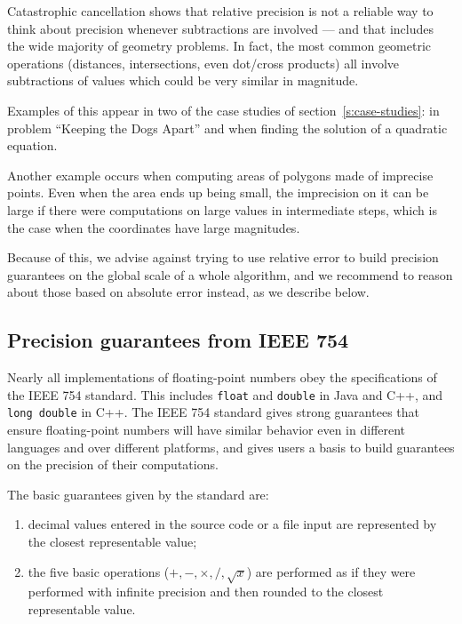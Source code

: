 Catastrophic cancellation shows that relative precision is not a reliable way to think about precision whenever subtractions are involved --- and that includes the wide majority of geometry problems.
In fact, the most common geometric operations (distances, intersections, even dot/cross products) all involve subtractions of values which could be very similar in magnitude.

Examples of this appear in two of the case studies of section~\ref{s:case-studies}: in problem ``Keeping the Dogs Apart'' and when finding the solution of a quadratic equation.

Another example occurs when computing areas of polygons made of imprecise points. Even when the area ends up being small, the imprecision on it can be large if there were computations on large values in intermediate steps, which is the case when the coordinates have large magnitudes.


Because of this, we advise against trying to use relative error to build precision guarantees on the global scale of a whole algorithm, and we recommend to reason about those based on absolute error instead, as we describe below.

\subsection{Precision guarantees from IEEE 754}

Nearly all implementations of floating-point numbers obey the specifications of the IEEE 754 standard. This includes \lstinline|float| and \lstinline|double| in Java and C++, and \lstinline|long double| in C++. The IEEE 754 standard gives strong guarantees that ensure floating-point numbers will have similar behavior even in different languages and over different platforms, and gives users a basis to build guarantees on the precision of their computations.

The basic guarantees given by the standard are:
\begin{enumerate}
\item decimal values entered in the source code or a file input are represented by the closest representable value;
\item the five basic operations ($+,-,\times,/,\sqrt{x}$) are performed as if they were performed with infinite precision and then rounded to the closest representable value.
\end{enumerate}

